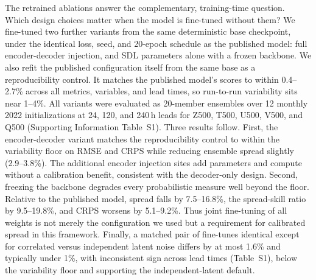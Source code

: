 \documentclass{agujournal2019}
\begin{document}
\begin{table}[h!]
\label{tab:elimination}
\end{table}

The retrained ablations answer the complementary, training-time question. Which design choices matter when the model is fine-tuned without them? We fine-tuned two further variants from the same deterministic base checkpoint, under the identical loss, seed, and 20-epoch schedule as the published model: full encoder-decoder injection, and SDL parameters alone with a frozen backbone. We also refit the published configuration itself from the same base as a reproducibility control. It matches the published model's scores to within 0.4--2.7\% across all metrics, variables, and lead times, so run-to-run variability sits near 1--4\%. All variants were evaluated as 20-member ensembles over 12 monthly 2022 initializations at 24, 120, and 240\,h leads for Z500, T500, U500, V500, and Q500 (Supporting Information Table~S1). Three results follow. First, the encoder-decoder variant matches the reproducibility control to within the variability floor on RMSE and CRPS while reducing ensemble spread slightly (2.9--3.8\%). The additional encoder injection sites add parameters and compute without a calibration benefit, consistent with the decoder-only design. Second, freezing the backbone degrades every probabilistic measure well beyond the floor. Relative to the published model, spread falls by 7.5--16.8\%, the spread-skill ratio by 9.5--19.8\%, and CRPS worsens by 5.1--9.2\%. Thus joint fine-tuning of all weights is not merely the configuration we used but a requirement for calibrated spread in this framework. Finally, a matched pair of fine-tunes identical except for correlated versus independent latent noise differs by at most 1.6\% and typically under 1\%, with inconsistent sign across lead times (Table~S1), below the variability floor and supporting the independent-latent default.

\end{document}
